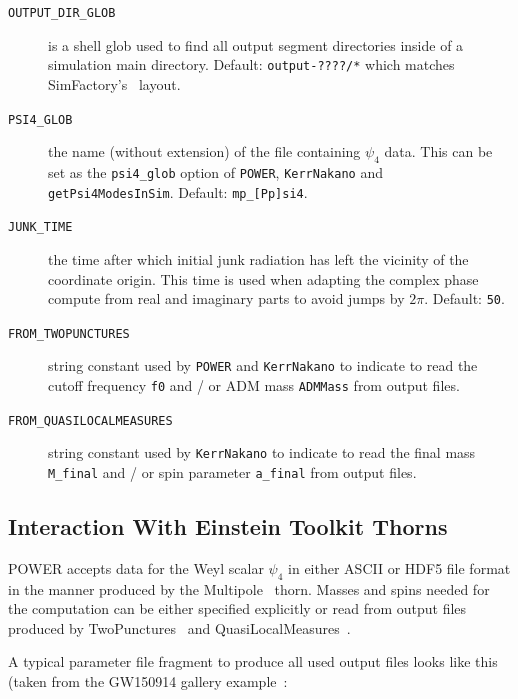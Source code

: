 \begin{description}
\item[\texttt{OUTPUT\_DIR\_GLOB}] is a shell glob used to find all output
segment directories inside of a simulation main directory. Default:
\texttt{output-????/*} which matches SimFactory's~\cite{POWER-SimFactory:web}
layout.
\item[\texttt{PSI4\_GLOB}] the name (without extension) of the file containing
$\psi_4$ data. This can be set as the \texttt{psi4\_glob} option of \texttt{POWER},
\texttt{KerrNakano} and \texttt{getPsi4ModesInSim}. Default:
\texttt{mp\_[Pp]si4}.
\item[\texttt{JUNK\_TIME}] the time after which initial junk radiation has
left the vicinity of the coordinate origin. This time is used when adapting
the complex phase compute from real and imaginary parts to avoid jumps by
$2\pi$. Default: \texttt{50}.
\item[\texttt{FROM\_TWOPUNCTURES}] string constant used by \texttt{POWER} and
\texttt{KerrNakano} to indicate to read the cutoff frequency \texttt{f0} and /
or ADM mass \texttt{ADMMass} from output files.
\item[\texttt{FROM\_QUASILOCALMEASURES}]  string constant used by 
\texttt{KerrNakano} to indicate to read the final mass \texttt{M\_final} and /
or spin parameter \texttt{a\_final} from output files.
\end{description}

\subsection{Interaction With Einstein Toolkit Thorns}

POWER accepts data for the Weyl scalar $\psi_4$ in either ASCII or HDF5 file
format in the manner produced by the Multipole~\cite{POWER-Multipole:web}
thorn. Masses and spins needed for the computation can be either specified
explicitly or read from output files produced by
TwoPunctures~\cite{POWER-TwoPunctures:web} and
QuasiLocalMeasures~\cite{POWER-QuasiLocalMeasures:web}.

A typical parameter file fragment to produce all used output files looks like
this (taken from the GW150914 gallery
example~\cite{POWER-wardell_barry_2016_155394}:

